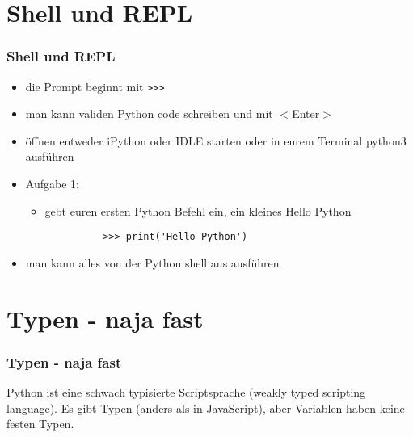 \documentclass{beamer}
\begin{document}
\section{Shell und REPL}
\begin{frame}[fragile]
  \frametitle{Shell und REPL}
  \begin{itemize}
    \item<1-> die Prompt beginnt mit \lstinline+>>>+
    \item<1-> man kann validen Python code schreiben und mit $<$Enter$>$
    \item<1-> öffnen entweder iPython oder IDLE starten oder in eurem Terminal python3 ausführen
    \item<2-> Aufgabe 1:\begin{itemize}
      \item gebt euren ersten Python Befehl ein, ein kleines Hello Python \\
        \begin{lstlisting}
          >>> print('Hello Python')
          \end{lstlisting}
    \end{itemize}
    \item<3-> man kann alles von der Python shell aus ausführen
  \end{itemize}
\end{frame}


\section{Typen - naja fast}
\begin{frame}
\frametitle{Typen - naja fast}
Python ist eine schwach typisierte Scriptsprache (weakly typed scripting language). Es gibt Typen (anders als in JavaScript), aber Variablen haben keine festen Typen.
\end{frame}
\end{document}
